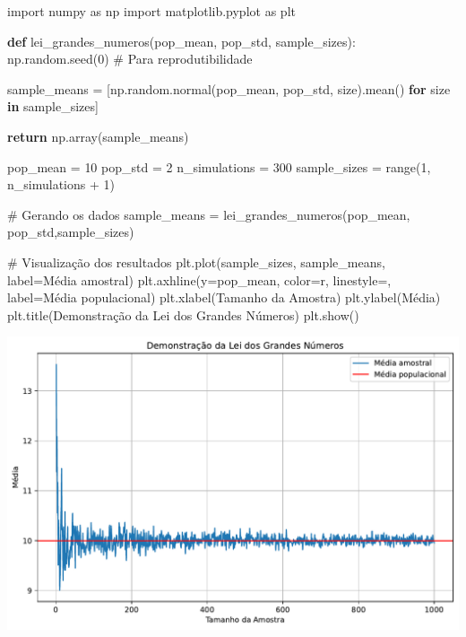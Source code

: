 \documentclass[
  letterpaper,
  DIV=11,
  numbers=noendperiod]{scrreprt}
\newenvironment{Shaded}{\begin{snugshade}}{\end{snugshade}}
\newcommand{\BuiltInTok}[1]{\textcolor[rgb]{0.00,0.23,0.31}{#1}}
\newcommand{\CommentTok}[1]{\textcolor[rgb]{0.37,0.37,0.37}{#1}}
\newcommand{\ControlFlowTok}[1]{\textcolor[rgb]{0.00,0.23,0.31}{\textbf{#1}}}
\newcommand{\DecValTok}[1]{\textcolor[rgb]{0.68,0.00,0.00}{#1}}
\newcommand{\ImportTok}[1]{\textcolor[rgb]{0.00,0.46,0.62}{#1}}
\newcommand{\KeywordTok}[1]{\textcolor[rgb]{0.00,0.23,0.31}{\textbf{#1}}}
\newcommand{\NormalTok}[1]{\textcolor[rgb]{0.00,0.23,0.31}{#1}}
\newcommand{\OperatorTok}[1]{\textcolor[rgb]{0.37,0.37,0.37}{#1}}
\newcommand{\StringTok}[1]{\textcolor[rgb]{0.13,0.47,0.30}{#1}}
\theoremstyle{definition}
\theoremstyle{plain}
\theoremstyle{remark}
\begin{document}
\begin{Shaded}
\begin{Highlighting}[]
\ImportTok{import}\NormalTok{ numpy }\ImportTok{as}\NormalTok{ np}
\ImportTok{import}\NormalTok{ matplotlib.pyplot }\ImportTok{as}\NormalTok{ plt}

\KeywordTok{def}\NormalTok{ lei\_grandes\_numeros(pop\_mean, pop\_std, sample\_sizes):}
\NormalTok{    np.random.seed(}\DecValTok{0}\NormalTok{)  }\CommentTok{\# Para reprodutibilidade}

\NormalTok{    sample\_means }\OperatorTok{=}\NormalTok{ [np.random.normal(pop\_mean, pop\_std, size).mean() }\ControlFlowTok{for}\NormalTok{ size }\KeywordTok{in}\NormalTok{ sample\_sizes]}

    \ControlFlowTok{return}\NormalTok{ np.array(sample\_means)}

\NormalTok{pop\_mean }\OperatorTok{=} \DecValTok{10}
\NormalTok{pop\_std }\OperatorTok{=} \DecValTok{2}
\NormalTok{n\_simulations }\OperatorTok{=} \DecValTok{300}
\NormalTok{sample\_sizes }\OperatorTok{=} \BuiltInTok{range}\NormalTok{(}\DecValTok{1}\NormalTok{, n\_simulations }\OperatorTok{+} \DecValTok{1}\NormalTok{)}

\CommentTok{\# Gerando os dados}
\NormalTok{sample\_means }\OperatorTok{=}\NormalTok{ lei\_grandes\_numeros(pop\_mean, pop\_std,sample\_sizes)}

\CommentTok{\# Visualização dos resultados}
\NormalTok{plt.plot(sample\_sizes, sample\_means, label}\OperatorTok{=}\StringTok{\textquotesingle{}Média amostral\textquotesingle{}}\NormalTok{)}
\NormalTok{plt.axhline(y}\OperatorTok{=}\NormalTok{pop\_mean, color}\OperatorTok{=}\StringTok{\textquotesingle{}r\textquotesingle{}}\NormalTok{, linestyle}\OperatorTok{=}\StringTok{\textquotesingle{}{-}\textquotesingle{}}\NormalTok{, label}\OperatorTok{=}\StringTok{\textquotesingle{}Média populacional\textquotesingle{}}\NormalTok{)}
\NormalTok{plt.xlabel(}\StringTok{\textquotesingle{}Tamanho da Amostra\textquotesingle{}}\NormalTok{)}
\NormalTok{plt.ylabel(}\StringTok{\textquotesingle{}Média\textquotesingle{}}\NormalTok{)}
\NormalTok{plt.title(}\StringTok{\textquotesingle{}Demonstração da Lei dos Grandes Números\textquotesingle{}}\NormalTok{)}
\NormalTok{plt.show()}
\end{Highlighting}
\end{Shaded}

\includegraphics{intro_files/figure-pdf/cell-2-output-1.pdf}
\end{document}
